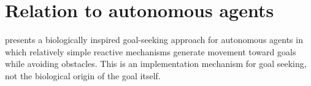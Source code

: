 \documentclass[a4paper]{article}
\begin{document}
   \section{Relation to autonomous agents}
      \cite{kerr-2017-biological-goal-seeking} presents a biologically inspired goal-seeking approach for autonomous agents in which relatively simple reactive mechanisms generate movement toward goals while avoiding obstacles. This is an implementation mechanism for goal seeking, not the biological origin of the goal itself.


   
   
\end{document}
